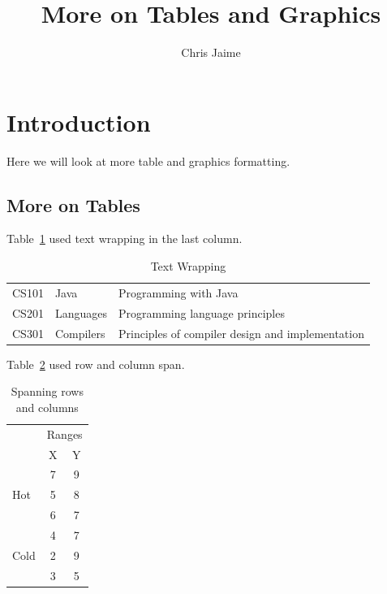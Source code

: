 \documentclass{proc}
\title{More on Tables and Graphics}
\author{Chris Jaime}
\date{}
\begin{document}
\maketitle

\section{Introduction}
Here we will look at more table and graphics formatting.

\subsection{More on Tables}
Table~\ref{tab:wrapping} used text wrapping in the last column.

\begin{table}[htbp]
\caption{Text Wrapping}
\begin{center}
\begin{tabular}{| l | l | p{3 cm} |} %
\hline
CS101 & Java & Programming with Java \\
CS201 & Languages & Programming language principles \\
CS301 & Compilers & Principles of compiler design and implementation \\
\hline
\end{tabular}
\end{center}
\label{tab:wrapping}
\end{table}

Table~\ref{tab:multi} used row and column span.

\begin{table}[htbp]
\caption{Spanning rows and columns}
\begin{center}
\begin{tabular}{| l | c | c |}
\hline
& \multicolumn{2}{c|}{Ranges} \\ %
& X & Y \\
\hline
\multirow{3}{*}{Hot} & 7 & 9 \\  %
& 5 & 8 \\
& 6 & 7 \\
\hline
\multirow{3}{*}{Cold} & 4 & 7 \\
& 2 & 9 \\
& 3 & 5 \\
\hline
\end{tabular}
\end{center}
\label{tab:multi}
\end{table}
\end{document}
